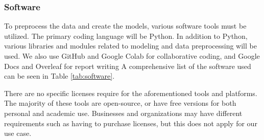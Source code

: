 \documentclass[stu,12pt,floatsintext]{apa7}
\begin{document}
\subsubsection{Software}
To preprocess the data and create the models, various software tools must be utilized. The primary coding language will be Python. In addition to Python, various libraries and modules related to modeling and data preprocessing will be used. We also use GitHub and Google Colab for collaborative coding, and Google Docs and Overleaf for report writing A comprehensive list of the software used can be seen in Table \ref{tab:software}.

There are no specific licenses require for the aforementioned tools and platforms. The majority of these tools are open-source, or have free versions for both personal and academic use. Businesses and organizations may have different requirements such as having to purchase licenses, but this does not apply for our use case.
\end{document}

